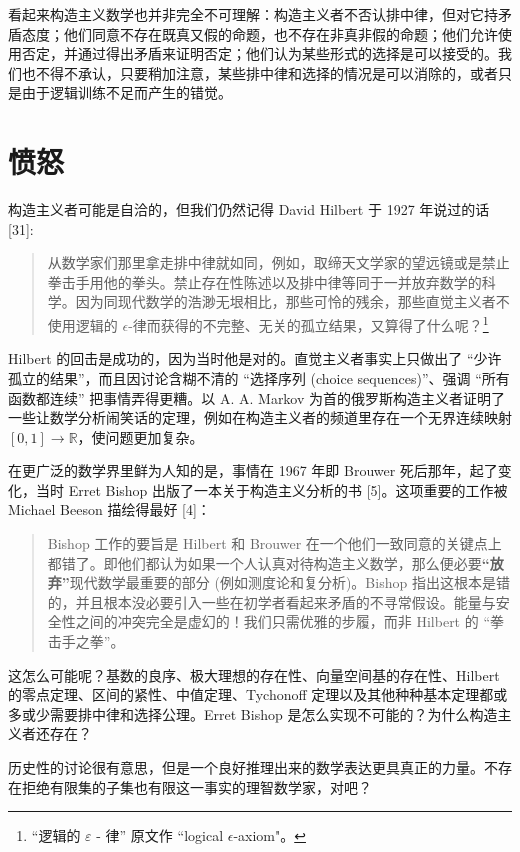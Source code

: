 \documentclass{ctexart}
\begin{document}
      看起来构造主义数学也并非完全不可理解：构造主义者不否认排中律，但对它持矛盾态度；他们同意不存在既真又假的命题，也不存在非真非假的命题；他们允许使用否定，并通过得出矛盾来证明否定；他们认为某些形式的选择是可以接受的。我们也不得不承认，只要稍加注意，某些排中律和选择的情况是可以消除的，或者只是由于逻辑训练不足而产生的错觉。

  \section{愤怒}
    构造主义者可能是自洽的，但我们仍然记得 David Hilbert 于 1927 年说过的话 [31]:
    \begin{quote}
        从数学家们那里拿走排中律就如同，例如，取缔天文学家的望远镜或是禁止拳击手用他的拳头。禁止存在性陈述以及排中律等同于一并放弃数学的科学。因为同现代数学的浩渺无垠相比，那些可怜的残余，那些直觉主义者不使用逻辑的 \(\epsilon\)-律而获得的不完整、无关的孤立结果，又算得了什么呢？\footnote{“逻辑的 \(\varepsilon\) - 律” 原文作 ``logical \(\epsilon\)-axiom"。}
    \end{quote}
    Hilbert 的回击是成功的，因为当时他是对的。直觉主义者事实上只做出了 “少许孤立的结果”，而且因讨论含糊不清的 “选择序列 (choice sequences)”、强调 “所有函数都连续” 把事情弄得更糟。以 A. A. Markov 为首的俄罗斯构造主义者证明了一些让数学分析闹笑话的定理，例如在构造主义者的频道里存在一个无界连续映射 \([0,1] \to \mathbb{R} \)，使问题更加复杂。
    
    在更广泛的数学界里鲜为人知的是，事情在 1967 年即 Brouwer 死后那年，起了变化，当时 Erret Bishop 出版了一本关于构造主义分析的书 [5]。这项重要的工作被 Michael Beeson 描绘得最好 [4]：

    \begin{quote}
        Bishop 工作的要旨是 Hilbert 和 Brouwer 在一个他们一致同意的关键点上都错了。即他们都认为如果一个人认真对待构造主义数学，那么便必要\textbf{“放弃”}现代数学最重要的部分 (例如测度论和复分析)。Bishop 指出这根本是错的，并且根本没必要引入一些在初学者看起来矛盾的不寻常假设。能量与安全性之间的冲突完全是虚幻的！我们只需优雅的步履，而非 Hilbert 的 “拳击手之拳”。
    \end{quote}

    这怎么可能呢？基数的良序、极大理想的存在性、向量空间基的存在性、Hilbert 的零点定理、区间的紧性、中值定理、Tychonoff 定理以及其他种种基本定理都或多或少需要排中律和选择公理。Erret Bishop 是怎么实现不可能的？为什么构造主义者还存在？

    历史性的讨论很有意思，但是一个良好推理出来的数学表达更具真正的力量。不存在拒绝有限集的子集也有限这一事实的理智数学家，对吧？
\end{document}
